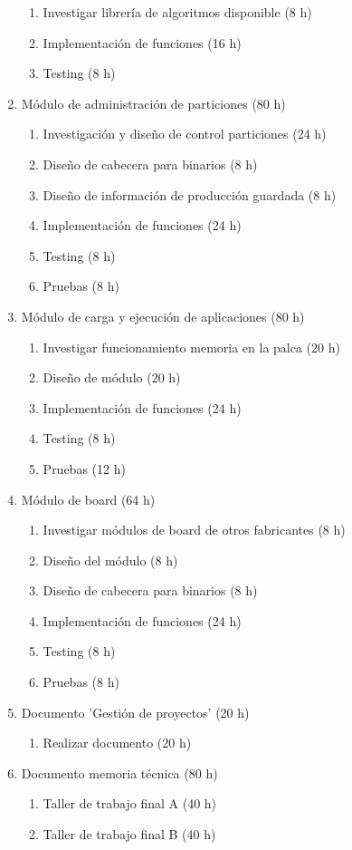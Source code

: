 \documentclass[
11pt, %
]{charter}
\begin{document}
\begin{enumerate}
\begin{enumerate}
	\item Investigar librería de algoritmos disponible (8 h)
	\item Implementación de funciones (16 h)
	\item Testing (8 h)
	\end{enumerate}
\item Módulo de administración de particiones (80 h)
	\begin{enumerate}
	\item Investigación y diseño de control particiones (24 h)
	\item Diseño de cabecera para binarios (8 h)
	\item Diseño de información de producción guardada (8 h)
	\item Implementación de funciones (24 h)
	\item Testing  (8 h)
	\item Pruebas  (8 h)
	\end{enumerate}
\item Módulo de carga y ejecución de aplicaciones (80 h)
	\begin{enumerate}
	\item Investigar funcionamiento memoria en la palca (20 h)
	\item Diseño de módulo (20 h)
	\item Implementación de funciones (24 h)
	\item Testing (8 h)
	\item Pruebas (12 h)
	\end{enumerate}
\item Módulo de board (64 h)
	\begin{enumerate}
	\item Investigar módulos de board de otros fabricantes (8 h)
	\item Diseño del módulo (8 h)
	\item Diseño de cabecera para binarios (8 h)
	\item Implementación de funciones (24 h)
	\item Testing  (8 h)
	\item Pruebas  (8 h)
	\end{enumerate}
\item Documento 'Gestión de proyectos' (20 h)
	\begin{enumerate}
	\item Realizar documento (20 h)
	\end{enumerate} 
\item Documento memoria técnica (80 h)
	\begin{enumerate}
	\item Taller de trabajo final A (40 h)
	\item Taller de trabajo final B (40 h)
	\end{enumerate} 
\end{enumerate}
\end{document}
